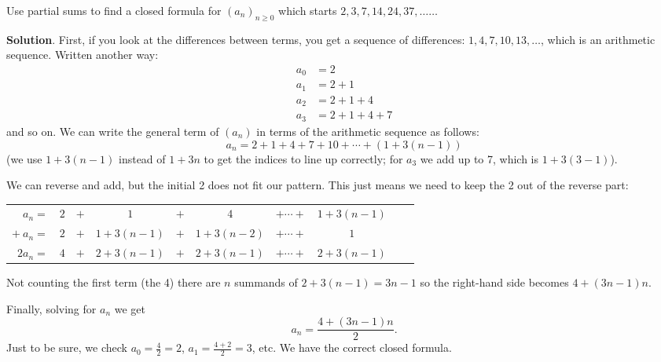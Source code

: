 \documentclass[11pt,]{book}
\theoremstyle{ptxplainnotitle}
\theoremstyle{ptxplaintitle}
\theoremstyle{ptxdefinitionnotitle}
\theoremstyle{ptxdefinitiontitle}
\theoremstyle{ptxdefinitionnotitle}
\theoremstyle{ptxdefinitiontitle}
\theoremstyle{ptxdefinitionnotitle}
\theoremstyle{ptxdefinitiontitle}
\theoremstyle{ptxdefinitiontitlenonumber}
\theoremstyle{ptxdefinitiontitlenonumber}
\numberwithin{equation}{chapter}
\newcommand{\hrulethin}  {\noalign{\hrule height 0.04em}}
\renewcommand{\d}{\displaystyle}
\newcommand{\amp}{&}
\begin{document}
\begin{example}\label{example-sum-of-arithmetic}
\hypertarget{p-194}{}%
Use partial sums to find a closed formula for \((a_n)_{n\ge 0}\) which starts \(2, 3, 7, 14, 24, 37,\ldots \ldots\)%
\par\smallskip%
\noindent\textbf{Solution}.\hypertarget{solution-15}{}\quad%
\hypertarget{p-195}{}%
First, if you look at the differences between terms, you get a sequence of differences: \(1,4,7,10,13, \ldots\), which is an arithmetic sequence.  Written another way:%
\begin{align*}
a_0 \amp = 2\\
a_1 \amp = 2+1\\
a_2 \amp = 2+1+4\\
a_3 \amp = 2+1+4+7
\end{align*}
and so on. We can write the general term of \((a_n)\) in terms of the arithmetic sequence as follows:%
\begin{equation*}
a_n = 2 + 1 + 4 + 7 + 10 + \cdots + (1+3(n-1))
\end{equation*}
(we use \(1+3(n-1)\) instead of \(1+3n\) to get the indices to line up correctly; for \(a_3\) we add up to 7, which is \(1+3(3-1)\)).%
\par
\hypertarget{p-196}{}%
We can reverse and add, but the initial 2 does not fit our pattern.  This just means we need to keep the 2 out of the reverse part:%
\begin{sidebyside}{1}{0}{0}{0}
\begin{sbspanel}{1}
{\centering%
\begin{tabular}{rccccccccc}
\(a_n  =\)&\(2\)&\(+\)&\(1\)&\(+\)&\(4\)&\(+ \cdots +\)&\(1+3(n-1)\)\tabularnewline[0pt]
\(+ ~ a_n  =\)&\(2\)&\(+\)&\(1+3(n-1)\)&\(+\)&\(1+3(n-2)\)&\(+ \cdots +\)&\(1\)\tabularnewline\hrulethin
\(2a_n =\)&\(4\)&\(+\)&\(2+3(n-1)\)&\(+\)&\(2+3(n-1)\)&\(+ \cdots +\)&\(2+3(n-1)\)
\end{tabular}
\par}
\end{sbspanel}
\end{sidebyside}
\par
\hypertarget{p-197}{}%
Not counting the first term (the 4) there are \(n\) summands of \(2+3(n-1) = 3n-1\) so the right-hand side becomes \(4+(3n-1)n\).%
\par
\hypertarget{p-198}{}%
Finally, solving for \(a_n\) we get%
\begin{equation*}
a_n = \d \frac{4+(3n-1)n}{2}.
\end{equation*}
Just to be sure, we check \(a_0 = \frac{4}{2} = 2\), \(a_1 = \frac{4+2}{2} = 3\), etc.  We have the correct closed formula.%
\end{example}
\typeout{************************************************}
\typeout{************************************************}
\end{document}
